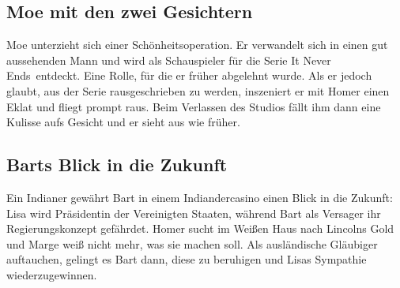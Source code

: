 \subsection{Moe mit den zwei Gesichtern}\label{BABF12}
Moe unterzieht sich einer Schönheitsoperation. Er verwandelt sich in einen gut aussehenden Mann und wird als Schauspieler für die Serie \glqq It Never Ends\grqq\ entdeckt. Eine Rolle, für die er früher abgelehnt wurde. Als er jedoch glaubt, aus der Serie rausgeschrieben zu werden, inszeniert er mit Homer einen Eklat und fliegt prompt raus. Beim Verlassen des Studios fällt ihm dann eine Kulisse aufs Gesicht und er sieht aus wie früher.

	
\subsection{Barts Blick in die Zukunft}\label{BABF13}
Ein Indianer gewährt Bart in einem Indiandercasino einen Blick in die Zukunft: Lisa wird Präsidentin der Vereinigten Staaten, während Bart als Versager ihr Regierungskonzept ge\-fähr\-det. Homer sucht im Weißen Haus nach Lincolns Gold und Marge weiß nicht mehr, was sie machen soll. Als ausländische Gläubiger auftauchen, gelingt es Bart dann, diese zu beruhigen und Lisas Sympathie wiederzugewinnen.

